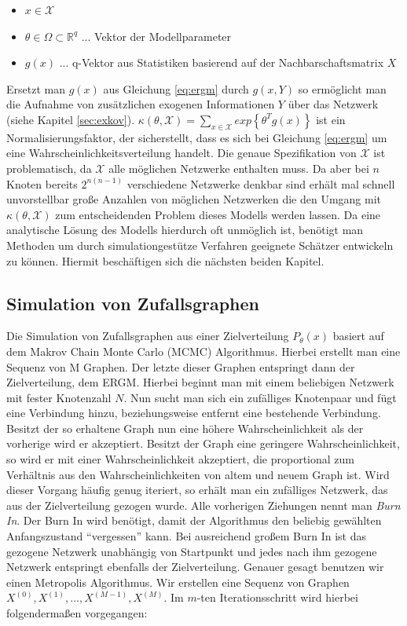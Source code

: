 \documentclass[a4paper,ngerman,oneside,titlepage,bibliography=totoc,11pt]{scrreprt}
\begin{document}
\begin{itemize}
	\item $x \in \mathcal{X}$
	\item $\theta \in \Omega \subset \mathbb{R}^q$ ... Vektor der Modellparameter
	\item $g(x)$ ... q-Vektor aus Statistiken basierend auf der Nachbarschaftsmatrix $X$
\end{itemize}
Ersetzt man $g(x)$ aus Gleichung \ref{eq:ergm} durch $g(x,Y)$ so ermöglicht man die Aufnahme von zusätzlichen exogenen Informationen $Y$ über das Netzwerk (siehe Kapitel \ref{sec:exkov}). $\kappa(\theta, \mathcal{X}) = \sum_{x \in \mathcal{X}}{exp\left\{\theta^T g(x)\right\}}$ ist ein Normalisierungsfaktor, der sicherstellt, dass es sich bei Gleichung \ref{eq:ergm} um eine Wahrscheinlichkeitsverteilung handelt. Die genaue Spezifikation von $\mathcal{X}$ ist problematisch, da $\mathcal{X}$ alle möglichen Netzwerke enthalten muss. Da aber bei $n$ Knoten bereits $2^{n(n-1)}$ verschiedene Netzwerke denkbar sind erhält mal schnell unvorstellbar große Anzahlen von möglichen Netzwerken die den Umgang mit  $\kappa(\theta, \mathcal{X})$ zum entscheidenden Problem dieses Modells werden lassen. Da eine analytische Lösung des Modells hierdurch oft unmöglich ist, benötigt man Methoden um durch simulationgestütze Verfahren geeignete Schätzer entwickeln zu können. Hiermit beschäftigen sich die nächsten beiden Kapitel.

\subsection{Simulation von Zufallsgraphen}
\label{sec:simzuf}
Die Simulation von Zufallsgraphen aus einer Zielverteilung $P_\theta(x)$ basiert auf dem Makrov Chain Monte Carlo (MCMC) Algorithmus. Hierbei erstellt man eine Sequenz von M Graphen. Der letzte dieser Graphen entspringt dann der Zielverteilung, dem ERGM. Hierbei beginnt man mit einem beliebigen Netzwerk mit fester Knotenzahl $N$. Nun sucht man sich ein zufälliges Knotenpaar und fügt eine Verbindung hinzu, beziehungsweise entfernt eine bestehende Verbindung. Besitzt der so erhaltene Graph nun eine höhere Wahrscheinlichkeit als der vorherige wird er akzeptiert. Besitzt der Graph eine geringere Wahrscheinlichkeit, so wird er mit einer Wahrscheinlichkeit akzeptiert, die proportional zum Verhältnis aus den Wahrscheinlichkeiten von altem und neuem Graph ist. Wird dieser Vorgang häufig genug iteriert, so erhält man ein zufälliges Netzwerk, das aus der Zielverteilung gezogen wurde. Alle vorherigen Ziehungen nennt man \emph{Burn In}. Der Burn In wird benötigt, damit der Algorithmus den beliebig gewählten Anfangszustand "`vergessen"' kann. Bei ausreichend großem Burn In ist das gezogene Netzwerk unabhängig von Startpunkt und jedes nach ihm gezogene Netzwerk entspringt ebenfalls der Zielverteilung.
Genauer gesagt benutzen wir einen Metropolis Algorithmus. Wir erstellen eine Sequenz von Graphen $X^{(0)}, X^{(1)}, ..., X^{(M-1)}, X^{(M)}$. Im $m$-ten Iterationsschritt wird hierbei folgendermaßen vorgegangen:
\end{document}

